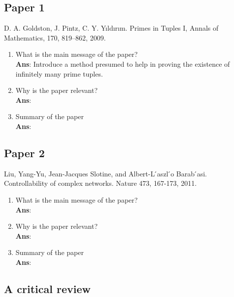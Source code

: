 \documentclass[11pt]{article}
\begin{document}
\subsection*{Paper 1}
D. A. Goldston, J. Pintz, C. Y. Yıldırım. Primes in Tuples I, Annals of Mathematics, 170, 819–862, 2009.
\begin{enumerate}[label=(\alph*)]
	\item What is the main message of the paper? \\ \textbf{Ans}: Introduce a method presumed to help in proving the existence of infinitely many prime tuples.
	\item Why is the paper relevant? \\ \textbf{Ans}:
	\item Summary of the paper \\ \textbf{Ans}:
\end{enumerate}

\subsection*{Paper 2}
Liu, Yang-Yu, Jean-Jacques Slotine, and Albert-L ́aszl ́o Barab ́asi. Controllability of complex networks. Nature 473, 167-173, 2011.
\begin{enumerate}[label=(\alph*)]
	\item What is the main message of the paper? \\ \textbf{Ans}:
	\item Why is the paper relevant? \\ \textbf{Ans}:
	\item Summary of the paper \\ \textbf{Ans}:
\end{enumerate}

\subsection*{A critical review}
\end{document}
